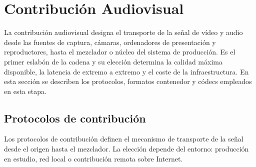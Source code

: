 \section{Contribución Audiovisual}
\label{sec:contribucion_av}

La contribución audiovisual designa el transporte de la señal de vídeo y audio desde
las fuentes de captura, cámaras, ordenadores de presentación y reproductores, hasta
el mezclador o núcleo del sistema de producción. Es el primer eslabón de la cadena y
su elección determina la calidad máxima disponible, la latencia de extremo a extremo
y el coste de la infraestructura. En esta sección se describen los protocolos, formatos
contenedor y códecs empleados en esta etapa.

\subsection{Protocolos de contribución}

Los protocolos de contribución definen el mecanismo de transporte de la señal desde
el origen hasta el mezclador. La elección depende del entorno: producción en estudio,
red local o contribución remota sobre Internet.

